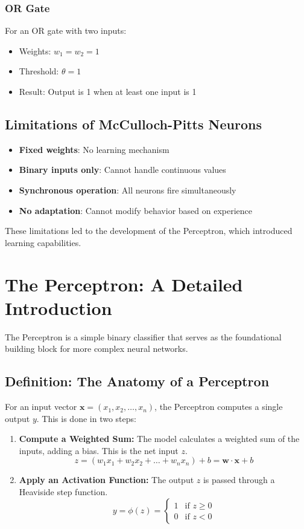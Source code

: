 \subsubsection{OR Gate}
For an OR gate with two inputs:
\begin{itemize}
    \item Weights: $w_1 = w_2 = 1$
    \item Threshold: $\theta = 1$
    \item Result: Output is 1 when at least one input is 1
\end{itemize}

\subsection{Limitations of McCulloch-Pitts Neurons}
\begin{itemize}
    \item \textbf{Fixed weights}: No learning mechanism
    \item \textbf{Binary inputs only}: Cannot handle continuous values
    \item \textbf{Synchronous operation}: All neurons fire simultaneously
    \item \textbf{No adaptation}: Cannot modify behavior based on experience
\end{itemize}

These limitations led to the development of the Perceptron, which introduced learning capabilities.

\section{The Perceptron: A Detailed Introduction}
The Perceptron is a simple binary classifier that serves as the foundational building block for more complex neural networks.

\subsection{Definition: The Anatomy of a Perceptron}
For an input vector \(\mathbf{x} = (x_1, x_2, \dots, x_n)\), the Perceptron computes a single output \(y\). This is done in two steps:
\begin{enumerate}
    \item \textbf{Compute a Weighted Sum:} The model calculates a weighted sum of the inputs, adding a bias. This is the net input \(z\).
    \[ z = (w_1 x_1 + w_2 x_2 + \dots + w_n x_n) + b = \mathbf{w} \cdot \mathbf{x} + b \]
    \item \textbf{Apply an Activation Function:} The output \(z\) is passed through a Heaviside step function.
    \[ y = \phi(z) = \begin{cases} 1 & \text{if } z \ge 0 \\ 0 & \text{if } z < 0 \end{cases} \]
\end{enumerate}

